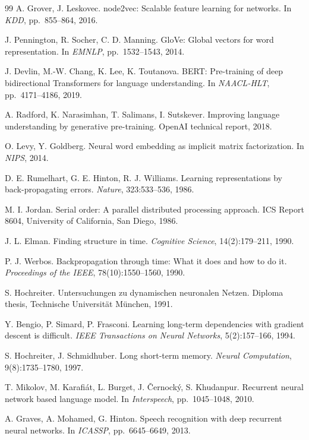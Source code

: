\documentclass[11pt,a4paper]{article}
\begin{document}
\begin{thebibliography}{99}
 A. Grover, J. Leskovec.
node2vec: Scalable feature learning for networks.
In \emph{KDD}, pp.~855--864, 2016.

 J. Pennington, R. Socher, C. D. Manning.
GloVe: Global vectors for word representation.
In \emph{EMNLP}, pp.~1532--1543, 2014.

 J. Devlin, M.-W. Chang, K. Lee, K. Toutanova.
BERT: Pre-training of deep bidirectional Transformers for language understanding.
In \emph{NAACL-HLT}, pp.~4171--4186, 2019.

 A. Radford, K. Narasimhan, T. Salimans, I. Sutskever.
Improving language understanding by generative pre-training.
OpenAI technical report, 2018.

 O. Levy, Y. Goldberg.
Neural word embedding as implicit matrix factorization.
In \emph{NIPS}, 2014.

 D. E. Rumelhart, G. E. Hinton, R. J. Williams.
Learning representations by back-propagating errors.
\emph{Nature}, 323:533--536, 1986.

 M. I. Jordan.
Serial order: A parallel distributed processing approach.
ICS Report 8604, University of California, San Diego, 1986.

 J. L. Elman.
Finding structure in time.
\emph{Cognitive Science}, 14(2):179--211, 1990.

 P. J. Werbos.
Backpropagation through time: What it does and how to do it.
\emph{Proceedings of the IEEE}, 78(10):1550--1560, 1990.

 S. Hochreiter.
Untersuchungen zu dynamischen neuronalen Netzen.
Diploma thesis, Technische Universit\"at M\"unchen, 1991.

 Y. Bengio, P. Simard, P. Frasconi.
Learning long-term dependencies with gradient descent is difficult.
\emph{IEEE Transactions on Neural Networks}, 5(2):157--166, 1994.

 S. Hochreiter, J. Schmidhuber.
Long short-term memory.
\emph{Neural Computation}, 9(8):1735--1780, 1997.

 T. Mikolov, M. Karafi\'at, L. Burget, J. \v{C}ernock\'y, S. Khudanpur.
Recurrent neural network based language model.
In \emph{Interspeech}, pp.~1045--1048, 2010.

 A. Graves, A. Mohamed, G. Hinton.
Speech recognition with deep recurrent neural networks.
In \emph{ICASSP}, pp.~6645--6649, 2013.


\end{thebibliography}
\end{document}
